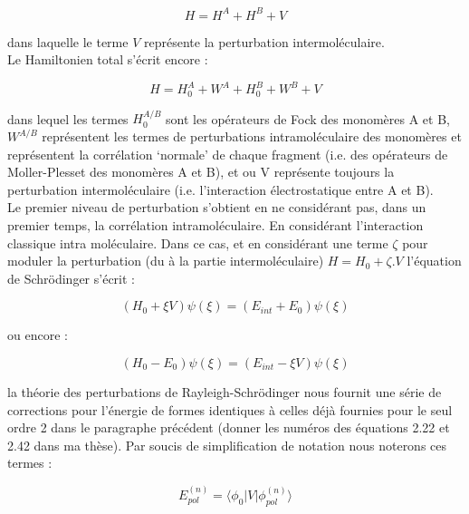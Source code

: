 	\begin{equation}
	H = H^{A} + H^{B} + V
	\end{equation}
	
	dans laquelle le terme $V$ représente la perturbation intermoléculaire.\\
	
	Le Hamiltonien total s'écrit encore :
	
	\begin{equation}
	H = H_{0}^{A} + W^{A} + H_{0}^{B} + W^{B} + V
	\end{equation}
	
	dans lequel les termes $H_{0}^{A/B}$ sont les opérateurs de Fock des monomères A et B, $W^{A/B}$ représentent les termes de perturbations intramoléculaire des monomères et représentent la corrélation ‘normale’ de chaque fragment (i.e. des opérateurs de Moller-Plesset des monomères A et B), et ou V représente toujours la perturbation intermoléculaire (i.e. l’interaction électrostatique entre A et B).\\
	
	Le premier niveau de perturbation s’obtient en ne considérant pas, dans un premier temps, la corrélation intramoléculaire. En considérant l’interaction classique intra moléculaire. Dans ce cas, et en considérant une terme $\zeta$ pour moduler la perturbation (du à la partie intermoléculaire) $H = H_0 + \zeta.V$ l’équation de Schr\"{o}dinger s’écrit :
	
	\begin{equation}
	(H_{0} + \xi V) \psi (\xi) = (E_{int} + E_{0}) \psi (\xi)
	\end{equation}
	
	ou encore :
	
	\begin{equation}
	(H_{0} - E_{0}) \psi (\xi) = (E_{int} - \xi V) \psi (\xi)
	\end{equation}
	
	la théorie des perturbations de Rayleigh-Schr\"{o}dinger nous fournit une série de corrections pour l’énergie \cite{chipman1973perturbation}
	de formes identiques à celles déjà fournies pour le seul ordre 2 dans le paragraphe précédent (donner les numéros des équations 2.22 et 2.42 dans ma thèse). Par soucis de simplification de notation nous noterons ces termes :
	
	\begin{equation}
	E_{pol}^{(n)} = \langle \phi_{0}|V| \phi_{pol}^{(n)} \rangle
	\end{equation}
	
